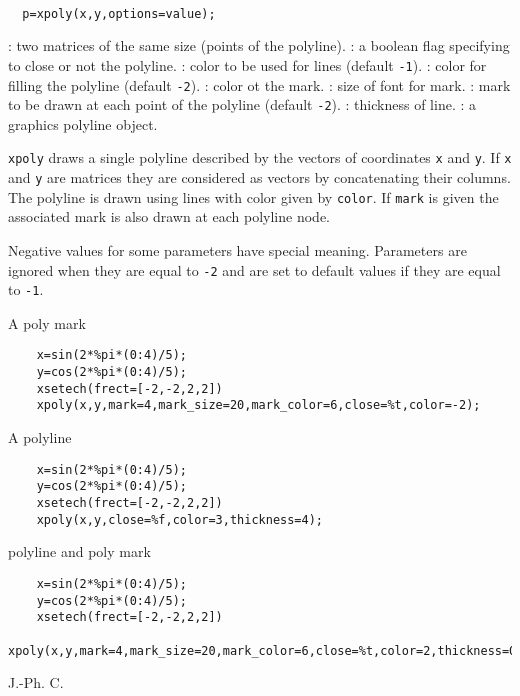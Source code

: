 \begin{mandesc}
  \\
\end{mandesc}
\begin{calling_sequence}
\begin{verbatim}
  p=xpoly(x,y,options=value);
\end{verbatim}
\end{calling_sequence}
\begin{parameters}
  \begin{varlist}
    : two matrices of the same size (points of the polyline).
    : a boolean flag specifying to close or not the polyline.
    : color to be used for lines (default \verb!-1!).
    : color for filling the polyline (default \verb!-2!).
    : color ot the mark.
    : size of font for mark.
    : mark to be drawn at each point of the polyline (default \verb!-2!).
    : thickness of line.
    : a graphics polyline object.
  \end{varlist}
\end{parameters}
\begin{mandescription}
  \verb!xpoly! draws a single polyline described by the vectors of
  coordinates \verb!x! and \verb!y!. If \verb!x! and
  \verb!y! are matrices they are considered as vectors by
  concatenating their columns. The polyline is drawn using
  lines with color given by \verb!color!. If \verb!mark! is
  given the associated mark is also drawn at each polyline node.

  Negative values for some parameters have special meaning.
  Parameters are ignored when they are equal to \verb!-2!
  and are set to default values if they are equal to \verb!-1!.
\end{mandescription}
\begin{examples}

\noindent A poly mark

  \begin{Verbatim}
    x=sin(2*%pi*(0:4)/5);
    y=cos(2*%pi*(0:4)/5);
    xsetech(frect=[-2,-2,2,2])
    xpoly(x,y,mark=4,mark_size=20,mark_color=6,close=%t,color=-2);
  \end{Verbatim}

\noindent A polyline

  \begin{Verbatim}
    x=sin(2*%pi*(0:4)/5);
    y=cos(2*%pi*(0:4)/5);
    xsetech(frect=[-2,-2,2,2])
    xpoly(x,y,close=%f,color=3,thickness=4);
  \end{Verbatim}

\noindent polyline and poly mark

  \begin{Verbatim}
    x=sin(2*%pi*(0:4)/5);
    y=cos(2*%pi*(0:4)/5);
    xsetech(frect=[-2,-2,2,2])
    xpoly(x,y,mark=4,mark_size=20,mark_color=6,close=%t,color=2,thickness=0);
  \end{Verbatim}

\end{examples}
\begin{manseealso}
    
\end{manseealso}
\begin{authors}
  J.-Ph. C.
\end{authors}
